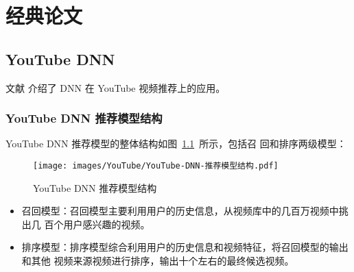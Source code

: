 \chapter{经典论文}
\section{YouTube DNN}

文献  介绍了 DNN 在 YouTube 视频推荐上的应用。

\subsection{YouTube DNN 推荐模型结构}
YouTube DNN 推荐模型的整体结构如图~\ref{fig:youtube-dnn-structure}~所示，包括召
回和排序两级模型：

\begin{figure}[ht]
  \centering
  \texttt{[image: images/YouTube/YouTube-DNN-推荐模型结构.pdf]}
  \caption{YouTube DNN 推荐模型结构}
  \label{fig:youtube-dnn-structure}
\end{figure}

\begin{itemize}
  \item 召回模型：召回模型主要利用用户的历史信息，从视频库中的几百万视频中挑出几
    百个用户感兴趣的视频。
  \item 排序模型：排序模型综合利用用户的历史信息和视频特征，将召回模型的输出和其他
    视频来源视频进行排序，输出十个左右的最终候选视频。
\end{itemize}

